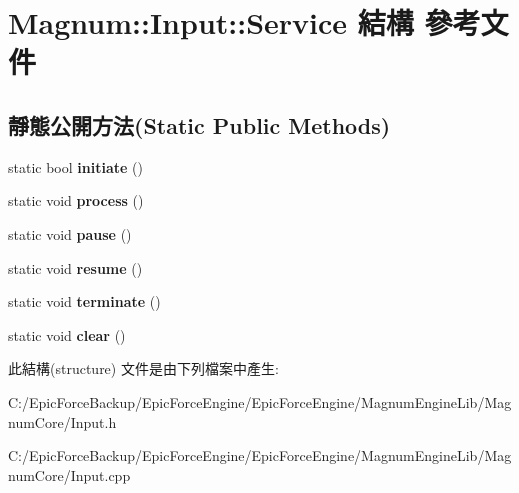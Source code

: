 \hypertarget{struct_magnum_1_1_input_1_1_service}{}\section{Magnum\+:\+:Input\+:\+:Service 結構 參考文件}
\label{struct_magnum_1_1_input_1_1_service}
\subsection*{靜態公開方法(Static Public Methods)}
\begin{DoxyCompactItemize}
\item 
static bool {\bfseries initiate} ()\hypertarget{struct_magnum_1_1_input_1_1_service_aa39ce3d3cc57c5f0230d8940cc10a1be}{}\label{struct_magnum_1_1_input_1_1_service_aa39ce3d3cc57c5f0230d8940cc10a1be}

\item 
static void {\bfseries process} ()\hypertarget{struct_magnum_1_1_input_1_1_service_a6127b6b710c56c83ca0ee3178dccb268}{}\label{struct_magnum_1_1_input_1_1_service_a6127b6b710c56c83ca0ee3178dccb268}

\item 
static void {\bfseries pause} ()\hypertarget{struct_magnum_1_1_input_1_1_service_a27821e5f2c3101304281ad1de2d33d4e}{}\label{struct_magnum_1_1_input_1_1_service_a27821e5f2c3101304281ad1de2d33d4e}

\item 
static void {\bfseries resume} ()\hypertarget{struct_magnum_1_1_input_1_1_service_a2f34ea54a965606801179a06248a058d}{}\label{struct_magnum_1_1_input_1_1_service_a2f34ea54a965606801179a06248a058d}

\item 
static void {\bfseries terminate} ()\hypertarget{struct_magnum_1_1_input_1_1_service_a02867e649e7e9455ef771ec9fe6e4a1e}{}\label{struct_magnum_1_1_input_1_1_service_a02867e649e7e9455ef771ec9fe6e4a1e}

\item 
static void {\bfseries clear} ()\hypertarget{struct_magnum_1_1_input_1_1_service_a29689d1a76f06d9e8be3e0cfbb02b21e}{}\label{struct_magnum_1_1_input_1_1_service_a29689d1a76f06d9e8be3e0cfbb02b21e}

\end{DoxyCompactItemize}


此結構(structure) 文件是由下列檔案中產生\+:\begin{DoxyCompactItemize}
\item 
C\+:/\+Epic\+Force\+Backup/\+Epic\+Force\+Engine/\+Epic\+Force\+Engine/\+Magnum\+Engine\+Lib/\+Magnum\+Core/Input.\+h\item 
C\+:/\+Epic\+Force\+Backup/\+Epic\+Force\+Engine/\+Epic\+Force\+Engine/\+Magnum\+Engine\+Lib/\+Magnum\+Core/Input.\+cpp\end{DoxyCompactItemize}

